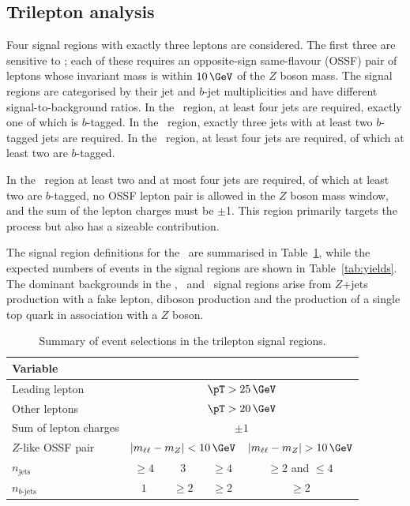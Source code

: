 \subsection{Trilepton analysis}

Four signal regions with exactly three leptons are considered.  The first three
are sensitive to \ttZ; each of these requires an opposite-sign same-flavour
(OSSF) pair of leptons whose invariant mass is within $10\,\GeV$ of the $Z$ boson mass.
The signal regions are categorised by their jet and $b$-jet multiplicities and
have different signal-to-background ratios.  In the \TLSRA\ region, at least
four jets are required, exactly one of which is $b$-tagged. In the \TLSRB\
region, exactly three jets with at least two $b$-tagged jets are required.  In
the \TLSRC\ region, at least four jets are required, of which at least two are
$b$-tagged. 

In the \TLSRD\ region at least two and at most four jets are required, of which
at least two are $b$-tagged, no OSSF lepton pair is allowed in the $Z$
boson mass window, and the sum of the lepton charges must be $\pm$1.  This region
primarily targets the \ttW process but also has a sizeable \ttZ contribution.

The signal region definitions for the \TLC\ are summarised
in Table~\ref{tab:SRs3l}, while the expected numbers of events in the signal
regions are shown in Table~\ref{tab:yields}.  The dominant backgrounds in the
\TLSRA, \TLSRB\ and \TLSRC\ signal regions arise from $Z$+jets production with
a fake lepton, diboson production and the production of a single top quark in
association with a $Z$ boson.

\begin{table}[htbp]
\centering
\caption{Summary of event selections in the trilepton signal regions.\vspace{1ex}} 
\label{tab:SRs3l}
\begin{tabular}{l|c|c|c|c}
\toprule
Variable  & \TLSRA & \TLSRB & \TLSRC & \TLSRD\\
\midrule
Leading lepton & \multicolumn{4}{c}{$\pT>25\,\GeV$} \\
Other leptons & \multicolumn{4}{c}{$\pT>20\,\GeV$} \\
Sum of lepton charges &  \multicolumn{4}{c}{$\pm1$} \\
$Z$-like OSSF pair & \multicolumn{3}{c|}{$|m_{\ell\ell} - m_Z| < 10\,\GeV$} & $|m_{\ell\ell} - m_Z| > 10\,\GeV$\\ 
$n_{\text{jets}}$ & $\ge 4$ & $3$ &  $\ge 4$ & $\ge2$ and $\le4$\\
$n_{b{\text{-jets}}}$ & $1$ & $\ge2$ & $\ge2$ & $\ge2$\\
\bottomrule
\end{tabular}
\end{table}

